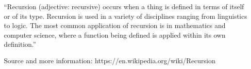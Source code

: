 ``Recursion (adjective: recursive) occurs when a thing is defined in terms of itself or of its type.
Recursion is used in a variety of disciplines ranging from linguistics to logic.
The most common application of recursion is in mathematics and computer science,
where a function being defined is applied within its own definition.''

Source and more information: https://en.wikipedia.org/wiki/Recursion

